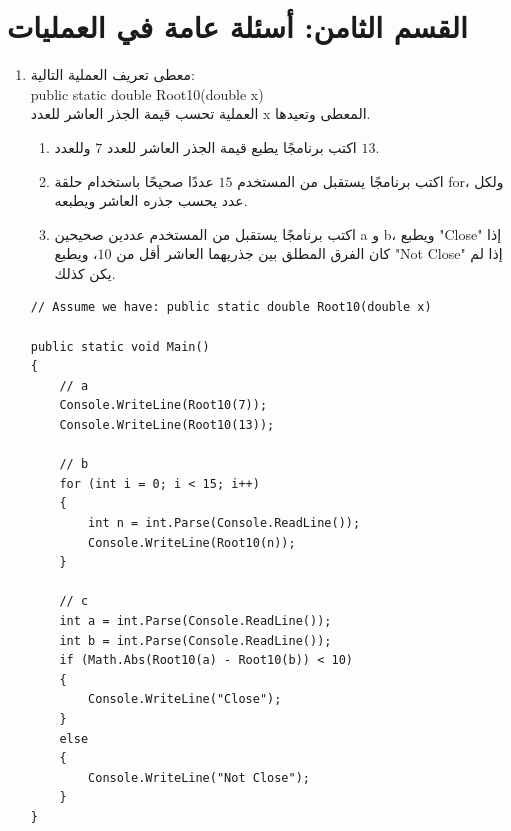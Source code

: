 \documentclass[14pt]{extarticle}
\begin{document}
\section*{القسم الثامن: أسئلة عامة في العمليات}

\begin{enumerate}[resume, itemsep=2em]

\item
معطى تعريف العملية التالية: \\
\textenglish{public static double Root10(double x)} \\
العملية تحسب قيمة الجذر العاشر للعدد \textenglish{x} المعطى وتعيدها.
\begin{enumerate}
    \item اكتب برنامجًا يطبع قيمة الجذر العاشر للعدد $7$ وللعدد $13$.
    \item اكتب برنامجًا يستقبل من المستخدم $15$ عددًا صحيحًا باستخدام حلقة \textenglish{for}، ولكل عدد يحسب جذره العاشر ويطبعه.
    \item اكتب برنامجًا يستقبل من المستخدم عددين صحيحين \textenglish{a} و \textenglish{b}، ويطبع \textenglish{"Close"} إذا كان الفرق المطلق بين جذريهما العاشر أقل من $10$، ويطبع \textenglish{"Not Close"} إذا لم يكن كذلك.
\end{enumerate}
\ifwithsols
\begin{boxSolution}
\begin{english}
\begin{verbatim}
// Assume we have: public static double Root10(double x)

public static void Main()
{
    // a
    Console.WriteLine(Root10(7));
    Console.WriteLine(Root10(13));

    // b
    for (int i = 0; i < 15; i++)
    {
        int n = int.Parse(Console.ReadLine());
        Console.WriteLine(Root10(n));
    }

    // c
    int a = int.Parse(Console.ReadLine());
    int b = int.Parse(Console.ReadLine());
    if (Math.Abs(Root10(a) - Root10(b)) < 10)
    {
        Console.WriteLine("Close");
    }
    else
    {
        Console.WriteLine("Not Close");
    }
}
\end{verbatim}
\end{english}
\end{boxSolution}
\fi
\filbreak


\end{enumerate}
\end{document}
